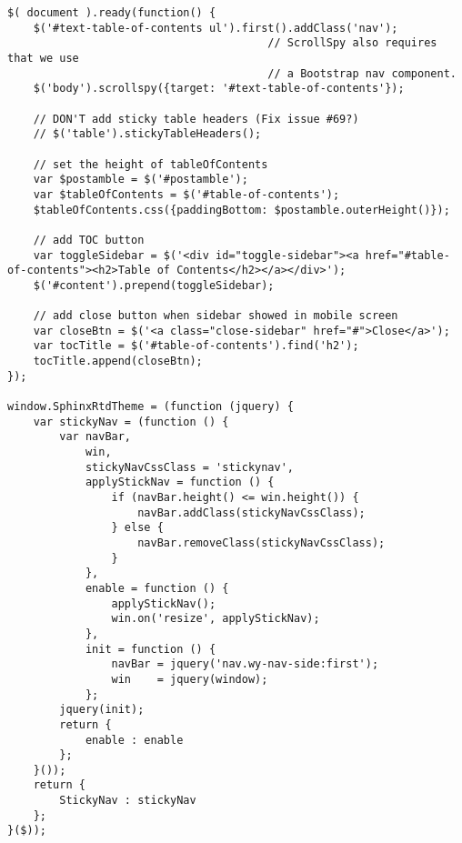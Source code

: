 \documentclass[11pt]{article}
\begin{document}
\begin{verbatim}
$( document ).ready(function() {
    $('#text-table-of-contents ul').first().addClass('nav');
                                        // ScrollSpy also requires that we use
                                        // a Bootstrap nav component.
    $('body').scrollspy({target: '#text-table-of-contents'});

    // DON'T add sticky table headers (Fix issue #69?)
    // $('table').stickyTableHeaders();

    // set the height of tableOfContents
    var $postamble = $('#postamble');
    var $tableOfContents = $('#table-of-contents');
    $tableOfContents.css({paddingBottom: $postamble.outerHeight()});

    // add TOC button
    var toggleSidebar = $('<div id="toggle-sidebar"><a href="#table-of-contents"><h2>Table of Contents</h2></a></div>');
    $('#content').prepend(toggleSidebar);

    // add close button when sidebar showed in mobile screen
    var closeBtn = $('<a class="close-sidebar" href="#">Close</a>');
    var tocTitle = $('#table-of-contents').find('h2');
    tocTitle.append(closeBtn);
});

window.SphinxRtdTheme = (function (jquery) {
    var stickyNav = (function () {
        var navBar,
            win,
            stickyNavCssClass = 'stickynav',
            applyStickNav = function () {
                if (navBar.height() <= win.height()) {
                    navBar.addClass(stickyNavCssClass);
                } else {
                    navBar.removeClass(stickyNavCssClass);
                }
            },
            enable = function () {
                applyStickNav();
                win.on('resize', applyStickNav);
            },
            init = function () {
                navBar = jquery('nav.wy-nav-side:first');
                win    = jquery(window);
            };
        jquery(init);
        return {
            enable : enable
        };
    }());
    return {
        StickyNav : stickyNav
    };
}($));
\end{verbatim}
\end{document}
